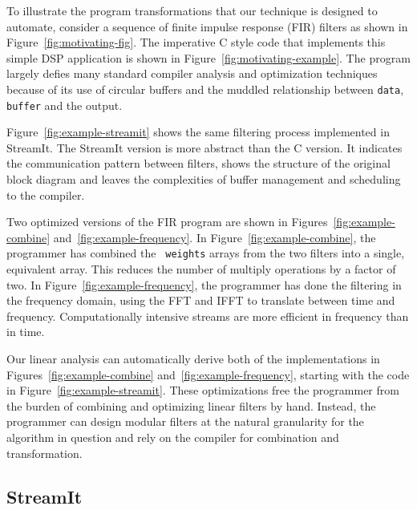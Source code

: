 To illustrate the program transformations that our technique is
designed to automate, consider a sequence of finite impulse response
(FIR) filters as shown in Figure~\ref{fig:motivating-fig}. The
imperative C style code that implements this simple DSP application is
shown in Figure~\ref{fig:motivating-example}. 
The program largely defies many standard compiler analysis
and optimization techniques because of its use of circular buffers and
the muddled relationship between {\tt data}, {\tt buffer} and the
output.

Figure~\ref{fig:example-streamit} shows the same filtering process
implemented in StreamIt. The StreamIt version is more abstract than
the C version.  It indicates the communication pattern between filters,
shows the structure of the original block diagram and leaves
the complexities of buffer management and scheduling to the compiler.

Two optimized versions of the FIR program are shown in
Figures~\ref{fig:example-combine} and~\ref{fig:example-frequency}.  In
Figure~\ref{fig:example-combine}, the programmer has combined the {\tt
weights} arrays from the two filters into a single, equivalent array.
This reduces the number of multiply operations by a factor of two.  In
Figure~\ref{fig:example-frequency}, the programmer has done the
filtering in the frequency domain, using the FFT and IFFT to translate
between time and frequency.  Computationally intensive streams are
more efficient in frequency than in time.

Our linear analysis can automatically derive both of the
implementations in Figures~\ref{fig:example-combine}
and~\ref{fig:example-frequency}, starting with the code in
Figure~\ref{fig:example-streamit}.  These optimizations free the
programmer from the burden of combining and optimizing linear filters
by hand.  Instead, the programmer can design modular filters at the
natural granularity for the algorithm in question and rely on the
compiler for combination and transformation.

\subsection{StreamIt}


